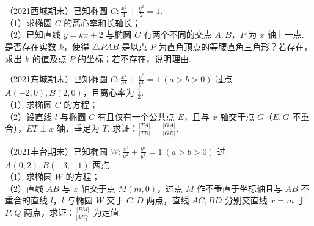 \begin{example} %
（2021西城期末）已知椭圆 $C:\frac{x^2}{4}+\frac{y^2}{2}=1$.\\
（1）求椭圆 $C$ 的离心率和长轴长；\\
（2）已知直线 $y=kx+2$ 与椭圆 $C$ 有两个不同的交点 $A,B$，$P$ 为 $x$ 轴上一点. 是否存在实数 $k$，使得 $\triangle PAB$ 是以点 $P$ 为直角顶点的等腰直角三角形？若存在，求出 $k$ 的值及点 $P$ 的坐标；若不存在，说明理由.
\end{example}

\begin{example} %
（2021东城期末）已知椭圆 $C:\frac{x^2}{a^2}+\frac{y^2}{b^2}=1\ (a>b>0)$ 过点 $A(-2,0),B(2,0)$，且离心率为 $\frac{1}{2}$.\\
（1）求椭圆 $C$ 的方程；\\
（2）设直线 $l$ 与椭圆 $C$ 有且仅有一个公共点 $E$，且与 $x$ 轴交于点 $G$（$E,G$ 不重合），$ET\perp x$ 轴，垂足为 $T$. 求证：$\frac{\lvert TA\rvert}{\lvert TB\rvert}=\frac{\lvert GA\rvert}{\lvert GB\rvert}$.
\end{example}

\begin{example} %
（2021丰台期末）已知椭圆 $W:\frac{x^2}{a^2}+\frac{y^2}{b^2}=1\ (a>b>0)$ 过 $A(0,2),B(-3,-1)$ 两点.\\
（1）求椭圆 $W$ 的方程；\\
（2）直线 $AB$ 与 $x$ 轴交于点 $M(m,0)$，过点 $M$ 作不垂直于坐标轴且与 $AB$ 不重合的直线 $l$，$l$ 与椭圆 $W$ 交于 $C,D$ 两点，直线 $AC,BD$ 分别交直线 $x=m$ 于 $P,Q$ 两点，求证：$\frac{\lvert PM\rvert}{\lvert MQ\rvert}$ 为定值.
\end{example}
